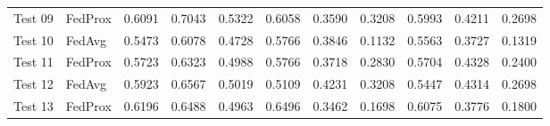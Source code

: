 \begin{table}[htbp]
\begin{tabular}{ll SSS SSS SSS}
    Test 09 & FedProx & 0.6091 & 0.7043 & 0.5322 & 0.6058 & 0.3590 & 0.3208 & 0.5993 & 0.4211 & 0.2698 \\
    Test 10 & FedAvg & 0.5473 & 0.6078 & 0.4728 & 0.5766 & 0.3846 & 0.1132 & 0.5563 & 0.3727 & 0.1319 \\
    Test 11 & FedProx & 0.5723 & 0.6323 & 0.4988 & 0.5766 & 0.3718 & 0.2830 & 0.5704 & 0.4328 & 0.2400 \\
    Test 12 & FedAvg & 0.5923 & 0.6567 & 0.5019 & 0.5109 & 0.4231 & 0.3208 & 0.5447 & 0.4314 & 0.2698 \\
    Test 13 & FedProx & 0.6196 & 0.6488 & 0.4963 & 0.6496 & 0.3462 & 0.1698 & 0.6075 & 0.3776 & 0.1800 \\
    \bottomrule
  \end{tabular}
\end{table}

